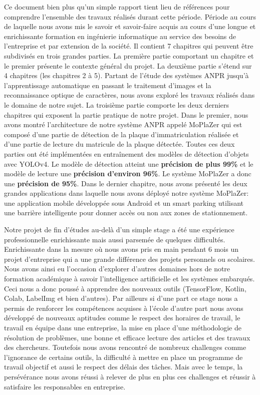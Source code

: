 Ce document bien plus qu’un simple rapport tient lieu de références pour comprendre l’ensemble des travaux réalisés durant cette période. Période au cours de laquelle nous avons mis le  savoir et savoir-faire acquis au cours d’une longue et enrichissante formation en ingénierie informatique au service des besoins de l’entreprise et par extension de la société. Il contient 7 chapitres qui peuvent être subdivisés en trois grandes parties. La première partie comportant un chapitre et le premier présente le contexte général du projet. La deuxième partie s'étend sur 4 chapitres (les chapitres 2 à 5). Partant de l’étude des systèmes ANPR jusqu’à l’apprentissage automatique en passant le traitement d’images et la reconnaissance optique de caractères, nous avons exploré les travaux réalisés  dans le domaine de notre sujet. La troisième partie comporte les deux derniers chapitres qui exposent la partie pratique de notre projet. Dans le premier, nous avons montré l’architecture de notre système ANPR appelé MoPlaZer qui est composé d'une partie de détection de la plaque d’immatriculation réalisée  et d’une partie de lecture du matricule de la plaque détectée. Toutes ces deux parties ont été implémentées en entraînement des modèles de détection d’objets avec YOLOv4. Le modèle de détection atteint une \textbf{précision de plus 99\%} et le modèle de lecture une \textbf{précision d'environ 96\%}. Le système MoPlaZer a donc une \textbf{précision de 95\%}. Dans le dernier chapitre, nous avons présenté les deux grandes applications dans laquelle nous avons déployé notre système MoPlaZer: une application mobile développée sous Android et un smart parking utilisant une barrière intelligente pour donner accès ou non aux zones de stationnement.


Notre projet de fin d’études au-delà d’un simple stage a été une expérience professionnelle enrichissante mais aussi parsemée de quelques difficultés. Enrichissante dans la mesure où nous avons pris en main pendant 6 mois un projet d’entreprise qui a une grande différence des projets personnels ou scolaires. Nous avons ainsi eu l’occasion d'explorer d'autres domaines hors de notre formation académique à savoir l’intelligence artificielle et les systèmes embarqués. Ceci nous a donc poussé à apprendre des nouveaux outils (TensorFlow, Kotlin, Colab, LabelImg et bien d’autres). Par ailleurs si d’une part ce stage nous a permis de renforcer les compétences acquises à l’école d’autre part nous avons développé de nouveaux aptitudes comme le respect des horaires de travail, le travail en équipe dans une entreprise, la mise en place d’une méthodologie de résolution de problèmes, une bonne et efficace lecture des articles et des travaux des chercheurs. Toutefois nous avons rencontré de nombreux challenges comme l’ignorance de certains outils, la difficulté à mettre en place un programme de travail objectif et aussi le respect des délais des tâches. Mais avec le temps, la persévérance nous avons réussi à relever de plus en plus ces challenges et réussir à satisfaire les responsables en entreprise. 


